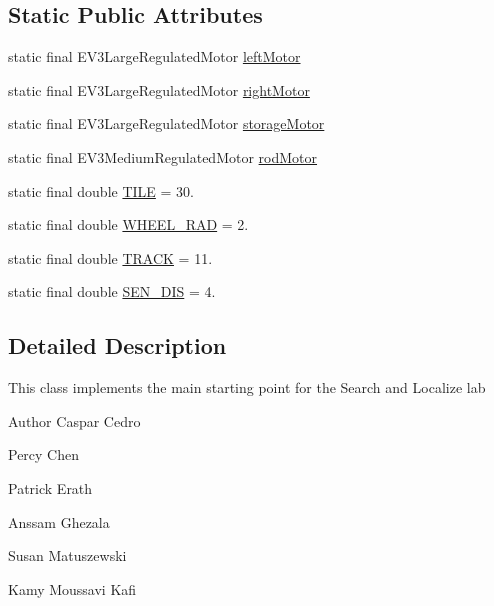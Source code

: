 \subsection*{Static Public Attributes}
\begin{DoxyCompactItemize}
\item 
static final E\+V3\+Large\+Regulated\+Motor \hyperlink{classca_1_1mcgill_1_1ecse211_1_1project_1_1_game_a40f6d5a8c70b88bf89b2171a02d2813f}{left\+Motor}
\item 
static final E\+V3\+Large\+Regulated\+Motor \hyperlink{classca_1_1mcgill_1_1ecse211_1_1project_1_1_game_a637614c1eb769dcdb09d897c66e453a2}{right\+Motor}
\item 
static final E\+V3\+Large\+Regulated\+Motor \hyperlink{classca_1_1mcgill_1_1ecse211_1_1project_1_1_game_a37d42c1d3b40b8eaa429866e37cd86c7}{storage\+Motor}
\item 
static final E\+V3\+Medium\+Regulated\+Motor \hyperlink{classca_1_1mcgill_1_1ecse211_1_1project_1_1_game_ad3c828a8e12ad3eaab01d2d846a3716f}{rod\+Motor}
\item 
static final double \hyperlink{classca_1_1mcgill_1_1ecse211_1_1project_1_1_game_a9a7a353789ddffcb938827410318b4fe}{T\+I\+LE} = 30.
\item 
static final double \hyperlink{classca_1_1mcgill_1_1ecse211_1_1project_1_1_game_a206492a827a716e6c606dc817cb4ff4d}{W\+H\+E\+E\+L\+\_\+\+R\+AD} = 2.
\item 
static final double \hyperlink{classca_1_1mcgill_1_1ecse211_1_1project_1_1_game_aa445d106d7fba82e78405e64087916b6}{T\+R\+A\+CK} = 11.
\item 
static final double \hyperlink{classca_1_1mcgill_1_1ecse211_1_1project_1_1_game_a7eb34dc64ead0f2c0db2367f773ae94c}{S\+E\+N\+\_\+\+D\+IS} = 4.
\end{DoxyCompactItemize}


\subsection{Detailed Description}
This class implements the main starting point for the Search and Localize lab

\begin{DoxyAuthor}{Author}
Caspar Cedro 

Percy Chen 

Patrick Erath 

Anssam Ghezala 

Susan Matuszewski 

Kamy Moussavi Kafi 
\end{DoxyAuthor}


